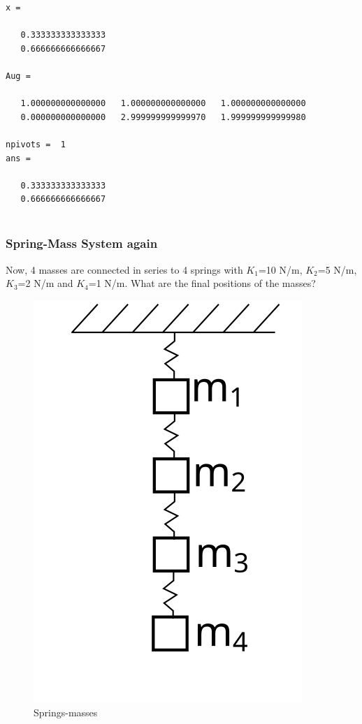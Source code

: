 \documentclass[11pt]{article}
\makeatletter
\def\maxwidth{\ifdim\Gin@nat@width>\linewidth\linewidth
    \else\Gin@nat@width\fi}
\let\Oldincludegraphics\includegraphics
\renewcommand{\includegraphics}[1]{\Oldincludegraphics[width=.8\maxwidth]{#1}}
\makeatother
\begin{document}
    \begin{Verbatim}[commandchars=\\\{\}]
x =

   0.333333333333333
   0.666666666666667

Aug =

   1.000000000000000   1.000000000000000   1.000000000000000
   0.000000000000000   2.999999999999970   1.999999999999980

npivots =  1
ans =

   0.333333333333333
   0.666666666666667


    \end{Verbatim}

    \subsubsection{Spring-Mass System again}\label{spring-mass-system-again}

Now, 4 masses are connected in series to 4 springs with \(K_{1}\)=10
N/m, \(K_{2}\)=5 N/m, \(K_{3}\)=2 N/m and \(K_{4}\)=1 N/m. What are the
final positions of the masses?

\begin{figure}[htbp]
\centering
\includegraphics{../lecture_09/mass_springs.svg}
\caption{Springs-masses}
\end{figure}
\end{document}

